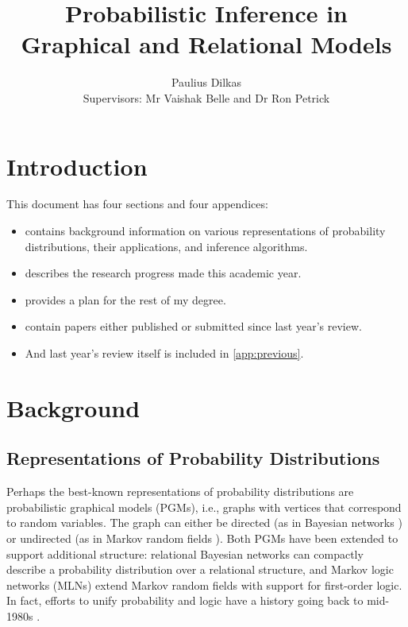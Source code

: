 \documentclass{article}
\title{Probabilistic Inference in Graphical and Relational Models}
\author{Paulius Dilkas \\[1ex] {\small Supervisors: Mr Vaishak Belle and Dr Ron
    Petrick}}
\affil{School of Informatics, University of Edinburgh}
\begin{document}
\maketitle

\section{Introduction}

This document has four sections and four appendices:
\begin{itemize}
\item {} contains background information on various
  representations of probability distributions, their applications, and
  inference algorithms.
\item {} describes the research progress made this academic
  year.
\item {} provides a plan for the rest of my degree.
\item {} contain papers either published or submitted
  since last year's review.
\item And last year's review itself is included in \cref{app:previous}.
\end{itemize}

\section{Background} \label{sec:background}

\subsection{Representations of Probability Distributions}

Perhaps the best-known representations of probability distributions are
probabilistic graphical models (PGMs), i.e., graphs with vertices that
correspond to random variables. The graph can either be directed (as in Bayesian
networks \cite{DBLP:books/daglib/0066829}) or undirected (as in Markov random
fields \cite{spitzer1971markov}). Both PGMs have been extended to support
additional structure: relational Bayesian networks \cite{DBLP:conf/uai/Jaeger97}
can compactly describe a probability distribution over a relational structure,
and Markov logic networks (MLNs) \cite{DBLP:journals/ml/RichardsonD06} extend
Markov random fields with support for first-order logic. In fact, efforts to
unify probability and logic have a history going back to mid-1980s
\cite{DBLP:journals/ndjfl/Hailperin84,DBLP:journals/ai/Nilsson86}.
\end{document}
